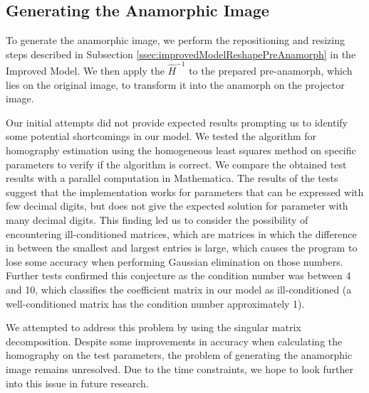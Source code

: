\documentclass[11pt, oneside, reqno]{book}
\begin{document}
\subsection{Generating the Anamorphic Image}
\label{ssec:2viewGenerateAnamorphicImage}

To generate the anamorphic image, we perform the repositioning and resizing steps described in Subsection \ref{ssec:improvedModelReshapePreAnamorph} in the Improved Model. We then apply the $\widehat{H}^{-1}$ to the prepared pre-anamorph, which lies on the original image, to transform it into the anamorph on the projector image. 

Our initial attempts did not provide expected results prompting us to identify some potential shortcomings in our model. We tested the algorithm for homography estimation using the homogeneous least squares method on specific parameters to verify if the algorithm is correct. We compare the obtained test results with a parallel computation in Mathematica. The results of the tests suggest that the implementation works for parameters that can be expressed with few decimal digits, but does not give the expected solution for parameter with many decimal digits. This finding led us to consider the possibility of encountering ill-conditioned matrices, which are matrices in which the difference in between the smallest and largest entries is large, which causes the program to lose some accuracy when performing Gaussian elimination on those numbers. Further tests confirmed this conjecture as the condition number was between 4 and 10, which classifies the coefficient matrix in our model as ill-conditioned (a well-conditioned matrix has the condition number approximately 1).

We attempted to address this problem by using the singular matrix decomposition. Despite some improvements in accuracy when calculating the homography on the test parameters, the problem of generating the anamorphic image remains unresolved.
Due to the time constraints, we hope to look further into this issue in future research.
\end{document}
